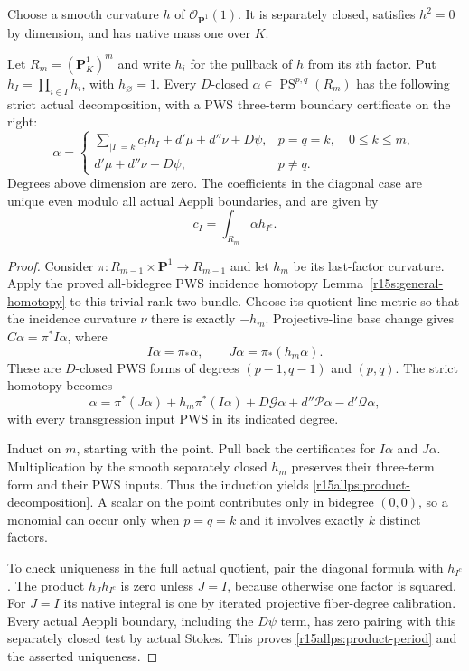 Choose a smooth curvature $h$ of $\mathcal O_{\mathbf P^1}(1)$.
It is separately closed, satisfies $h^2=0$ by dimension, and
has native mass one over $K$.

\begin{lemma}
\label{r15allps:product}
Let $R_m=(\mathbf P_K^1)^m$ and write $h_i$ for the pullback
of $h$ from its $i$th factor. Put $h_I=\prod_{i\in I}h_i$,
with $h_\varnothing=1$. Every $D$-closed
$\alpha\in\operatorname{PS}^{p,q}(R_m)$ has the following
strict actual decomposition, with a PWS three-term boundary
certificate on the right:
\[
 \alpha=
 \begin{cases}
 \displaystyle\sum_{|I|=k}c_I h_I+d'\mu+d''\nu+D\psi,
                                      &p=q=k,\quad0\leq k\leq m,\\
 d'\mu+d''\nu+D\psi,                    &p\ne q.
 \end{cases}
\tag{PA15.3}\label{r15allps:product-decomposition}
\]
Degrees above dimension are zero. The coefficients in the
diagonal case are unique even modulo all actual Aeppli
boundaries, and are given by
\[
                         c_I=\int_{R_m}\alpha h_{I^c}.
\tag{PA15.4}\label{r15allps:product-period}
\]
\end{lemma}

\begin{proof}
Consider $\pi:R_{m-1}\times\mathbf P^1\to R_{m-1}$ and
let $h_m$ be its last-factor curvature. Apply the proved
all-bidegree PWS incidence homotopy
Lemma~\ref{r15s:general-homotopy} to this trivial rank-two
bundle. Choose its quotient-line metric so that the incidence
curvature $\nu$ there is exactly $-h_m$.
Projective-line base change gives $C\alpha=\pi^*I\alpha$,
where
\[
              I\alpha=\pi_*\alpha,\qquad
              J\alpha=\pi_*(h_m\alpha).
\]
These are $D$-closed PWS forms of degrees $(p-1,q-1)$ and
$(p,q)$. The strict homotopy becomes
\[
 \alpha=\pi^*(J\alpha)+h_m\pi^*(I\alpha)
               +D\mathcal G\alpha+d''\mathcal P\alpha
                                      -d'\mathcal Q\alpha,
\tag{PA15.5}\label{r15allps:product-homotopy}
\]
with every transgression input PWS in its indicated degree.

Induct on $m$, starting with the point. Pull back the
certificates for $I\alpha$ and $J\alpha$. Multiplication by
the smooth separately closed $h_m$ preserves their three-term
form and their PWS inputs. Thus the induction yields
\eqref{r15allps:product-decomposition}. A scalar on the point
contributes only in bidegree $(0,0)$, so a monomial can occur
only when $p=q=k$ and it involves exactly $k$ distinct factors.

To check uniqueness in the full actual quotient, pair the
diagonal formula with $h_{I^c}$. The product $h_Jh_{I^c}$
is zero unless $J=I$, because otherwise one factor is squared.
For $J=I$ its native integral is one by iterated projective
fiber-degree calibration. Every actual Aeppli boundary, including
the $D\psi$ term, has zero pairing with this separately closed
test by actual Stokes. This proves
\eqref{r15allps:product-period} and the asserted uniqueness.
\end{proof}

